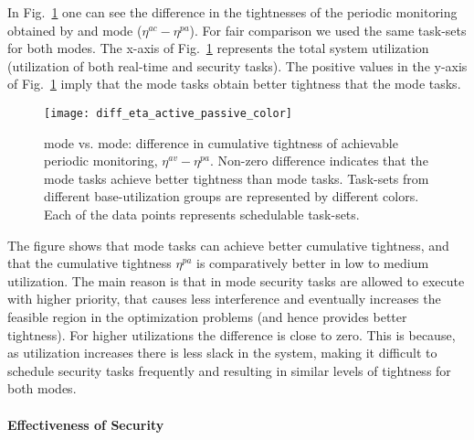 \documentclass[../rt_server_main.tex]{subfiles}
\begin{document}
In Fig.~\ref{fig:diff_eta_active_passive} one can see the difference in the tightnesses of the periodic monitoring obtained by \pve and \ave mode (\ie $\eta^{ac} -\eta^{pa}$). For fair comparison we used the same task-sets for both modes. The x-axis of Fig.~\ref{fig:diff_eta_active_passive} represents the total system utilization (\eg utilization of both real-time and security tasks). The positive values in the y-axis of Fig.~\ref{fig:diff_eta_active_passive} imply that the \ave mode tasks obtain better tightness that the \pve mode tasks.  

 \begin{figure}[!t]
\vspace{-1.00\baselineskip}
\centering
\texttt{[image: diff\_eta\_active\_passive\_color]}
\caption{\pve mode vs. \ave mode: difference in cumulative tightness of achievable periodic monitoring, $\eta^{av} - \eta^{pa}$. Non-zero difference indicates that the \ave mode tasks achieve better tightness than \pve mode tasks. %
Task-sets from different base-utilization groups are represented by different colors. Each of the data points represents schedulable task-sets.}
\label{fig:diff_eta_active_passive}
\vspace{-0.5\baselineskip}
 \end{figure}

The figure shows that \ave mode tasks can achieve better cumulative tightness, and that the cumulative tightness $\eta^{pa}$ is comparatively better in low to medium utilization. The main reason is that in \ave mode security tasks are allowed to execute with higher priority, that causes less interference and eventually increases the feasible region in the optimization problems (and hence provides better tightness). For higher utilizations the difference is close to zero. %
This is because, as utilization increases there is less slack in the system, making it difficult to schedule security tasks frequently and resulting in similar levels of tightness for both modes.


 


\paragraph{Effectiveness of Security}
\end{document}

